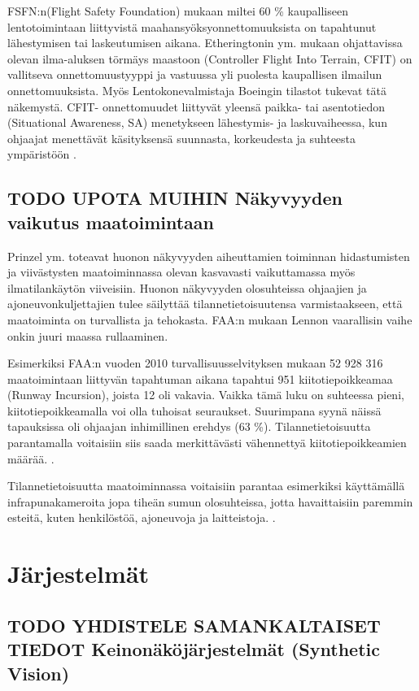 \documentclass[utf8,bachelor,manualbib]{gradu3}
\begin{document}
FSFN:n(Flight Safety Foundation) mukaan miltei 60 \% kaupalliseen lentotoimintaan liittyvistä maahansyöksyonnettomuuksista on tapahtunut lähestymisen tai laskeutumisen aikana. Etheringtonin ym. \citeyearpar{etherington2000} mukaan ohjattavissa olevan ilma-aluksen törmäys maastoon (Controller Flight Into Terrain, CFIT) on vallitseva onnettomuustyyppi ja vastuussa yli puolesta kaupallisen ilmailun onnettomuuksista. Myös Lentokonevalmistaja Boeingin \citeyearpar{boeing1996} tilastot tukevat tätä näkemystä. CFIT- onnettomuudet liittyvät yleensä paikka- tai asentotiedon (Situational Awareness, SA) menetykseen lähestymis- ja laskuvaiheessa, kun ohjaajat menettävät käsityksensä suunnasta, korkeudesta ja suhteesta ympäristöön \cite{schnellym2004}.

\section{TODO UPOTA MUIHIN Näkyvyyden vaikutus maatoimintaan}

Prinzel ym. \citeyearpar{prinzel2013} toteavat huonon näkyvyyden aiheuttamien toiminnan hidastumisten ja viivästysten maatoiminnassa olevan kasvavasti vaikuttamassa myös ilmatilankäytön viiveisiin. Huonon näkyvyyden olosuhteissa ohjaajien ja ajoneuvonkuljettajien tulee säilyttää tilannetietoisuutensa varmistaakseen, että maatoiminta on turvallista ja tehokasta. FAA:n mukaan \citeyearpar{gerold2001} Lennon vaarallisin vaihe onkin juuri maassa rullaaminen.

Esimerkiksi FAA:n vuoden 2010 turvallisuusselvityksen mukaan 52 928 316 maatoimintaan liittyvän tapahtuman aikana tapahtui 951 kiitotiepoikkeamaa (Runway Incursion), joista 12 oli vakavia. Vaikka tämä luku on suhteessa pieni, kiitotiepoikkeamalla voi olla tuhoisat seuraukset. Suurimpana syynä näissä tapauksissa oli ohjaajan inhimillinen erehdys (63 \%). Tilannetietoisuutta parantamalla voitaisiin siis saada merkittävästi vähennettyä kiitotiepoikkeamien määrää. \citep{prinzel2013}.

Tilannetietoisuutta maatoiminnassa voitaisiin parantaa esimerkiksi käyttämällä infrapunakameroita jopa tiheän sumun olosuhteissa, jotta havaittaisiin paremmin esteitä, kuten henkilöstöä, ajoneuvoja ja laitteistoja. \citep{beiergemperlein2004}.

\chapter{Järjestelmät}

\section{TODO YHDISTELE SAMANKALTAISET TIEDOT Keinonäköjärjestelmät (Synthetic Vision)}
\end{document}
